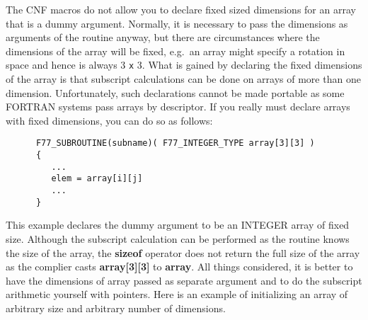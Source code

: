 The CNF macros do not allow you to declare fixed sized dimensions for an array
that is a dummy argument. Normally, it is necessary to pass the dimensions as
arguments of the routine anyway, but there are circumstances where the
dimensions of the array will be fixed, e.g.\ an array might specify a rotation
in space and hence is always 3 {\tt x} 3. What is gained by declaring the
fixed dimensions of the array is that subscript calculations can be done on
arrays of more than one dimension. Unfortunately, such declarations cannot be
made portable as some FORTRAN systems pass arrays by descriptor. If you really
must declare arrays with fixed dimensions, you can do so as follows:

{\small \begin{verbatim}
      F77_SUBROUTINE(subname)( F77_INTEGER_TYPE array[3][3] )
      {
         ...
         elem = array[i][j]
         ...
      }
\end{verbatim} }

This example declares the dummy argument to be an INTEGER array of fixed size. 
Although the subscript calculation can be performed as the routine knows the
size of the array, the {\bf sizeof} operator does not return the full size of
the array as the complier casts {\bf array[3][3]} to {\tt *}{\bf array}. All
things considered, it is better to have the dimensions of array passed as
separate argument and to do the subscript arithmetic yourself with pointers.
Here is an example of initializing an array of arbitrary size and arbitrary
number of dimensions.

